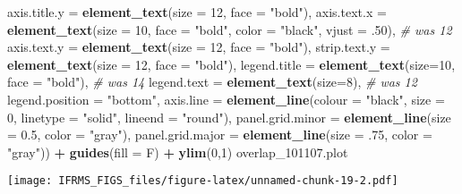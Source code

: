 \documentclass[
]{article}
\newenvironment{Shaded}{\begin{snugshade}}{\end{snugshade}}
\newcommand{\CommentTok}[1]{\textcolor[rgb]{0.56,0.35,0.01}{\textit{#1}}}
\newcommand{\DataTypeTok}[1]{\textcolor[rgb]{0.13,0.29,0.53}{#1}}
\newcommand{\DecValTok}[1]{\textcolor[rgb]{0.00,0.00,0.81}{#1}}
\newcommand{\FloatTok}[1]{\textcolor[rgb]{0.00,0.00,0.81}{#1}}
\newcommand{\KeywordTok}[1]{\textcolor[rgb]{0.13,0.29,0.53}{\textbf{#1}}}
\newcommand{\NormalTok}[1]{#1}
\newcommand{\OperatorTok}[1]{\textcolor[rgb]{0.81,0.36,0.00}{\textbf{#1}}}
\newcommand{\StringTok}[1]{\textcolor[rgb]{0.31,0.60,0.02}{#1}}
\begin{document}
\begin{Shaded}
\begin{Highlighting}[]
        \DataTypeTok{axis.title.y =} \KeywordTok{element_text}\NormalTok{(}\DataTypeTok{size =} \DecValTok{12}\NormalTok{, }\DataTypeTok{face =} \StringTok{"bold"}\NormalTok{),}
        \DataTypeTok{axis.text.x =} \KeywordTok{element_text}\NormalTok{(}\DataTypeTok{size =} \DecValTok{10}\NormalTok{, }\DataTypeTok{face =} \StringTok{"bold"}\NormalTok{, }\DataTypeTok{color =} \StringTok{"black"}\NormalTok{, }\DataTypeTok{vjust =} \FloatTok{.50}\NormalTok{), }\CommentTok{# was 12}
        \DataTypeTok{axis.text.y =} \KeywordTok{element_text}\NormalTok{(}\DataTypeTok{size =} \DecValTok{12}\NormalTok{, }\DataTypeTok{face =} \StringTok{"bold"}\NormalTok{),}
        \DataTypeTok{strip.text.y =} \KeywordTok{element_text}\NormalTok{(}\DataTypeTok{size =} \DecValTok{12}\NormalTok{, }\DataTypeTok{face =} \StringTok{"bold"}\NormalTok{),}
        \DataTypeTok{legend.title =} \KeywordTok{element_text}\NormalTok{(}\DataTypeTok{size=}\DecValTok{10}\NormalTok{, }\DataTypeTok{face =} \StringTok{"bold"}\NormalTok{), }\CommentTok{# was 14}
        \DataTypeTok{legend.text =} \KeywordTok{element_text}\NormalTok{(}\DataTypeTok{size=}\DecValTok{8}\NormalTok{), }\CommentTok{# was 12}
        \DataTypeTok{legend.position =} \StringTok{"bottom"}\NormalTok{,}
        \DataTypeTok{axis.line =} \KeywordTok{element_line}\NormalTok{(}\DataTypeTok{colour =} \StringTok{"black"}\NormalTok{, }
                                 \DataTypeTok{size =} \DecValTok{0}\NormalTok{, }\DataTypeTok{linetype =} \StringTok{"solid"}\NormalTok{, }\DataTypeTok{lineend =} \StringTok{"round"}\NormalTok{),}
        \DataTypeTok{panel.grid.minor =} \KeywordTok{element_line}\NormalTok{(}\DataTypeTok{size =} \FloatTok{0.5}\NormalTok{, }\DataTypeTok{color =} \StringTok{"gray"}\NormalTok{), }
        \DataTypeTok{panel.grid.major =} \KeywordTok{element_line}\NormalTok{(}\DataTypeTok{size =} \FloatTok{.75}\NormalTok{, }\DataTypeTok{color =} \StringTok{"gray"}\NormalTok{)) }\OperatorTok{+}\StringTok{ }
\StringTok{  }\KeywordTok{guides}\NormalTok{(}\DataTypeTok{fill =}\NormalTok{ F) }\OperatorTok{+}\StringTok{ }
\StringTok{  }\KeywordTok{ylim}\NormalTok{(}\DecValTok{0}\NormalTok{,}\DecValTok{1}\NormalTok{) }
\NormalTok{overlap_}\FloatTok{101107.}\NormalTok{plot}
\end{Highlighting}
\end{Shaded}

\texttt{[image: IFRMS\_FIGS\_files/figure-latex/unnamed-chunk-19-2.pdf]}
\end{document}
